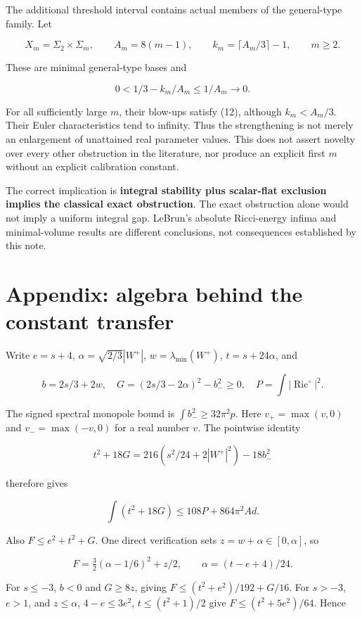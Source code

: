 \documentclass[
  11pt,
]{article}
\begin{document}
The additional threshold interval contains actual members of the
general-type family. Let

\[
X_m=\Sigma_2\times\Sigma_m,\qquad A_m=8(m-1),\qquad
k_m=\lceil A_m/3\rceil-1,\qquad m\ge2.
\]

These are minimal general-type bases and

\[
0<1/3-k_m/A_m\le1/A_m\longrightarrow0.
\]

For all sufficiently large \(m\), their blow-ups satisfy (12), although
\(k_m<A_m/3\). Their Euler characteristics tend to infinity. Thus the
strengthening is not merely an enlargement of unattained real parameter
values. This does not assert novelty over every other obstruction in the
literature, nor produce an explicit first \(m\) without an explicit
calibration constant.

The correct implication is \textbf{integral stability plus scalar-flat
exclusion implies the classical exact obstruction}. The exact
obstruction alone would not imply a uniform integral gap. LeBrun's
absolute Ricci-energy infima and minimal-volume results are different
conclusions, not consequences established by this note.

\hypertarget{appendix-algebra-behind-the-constant-transfer}{%
\section{Appendix: algebra behind the constant
transfer}\label{appendix-algebra-behind-the-constant-transfer}}

Write \(e=s+4\), \(\alpha=\sqrt{2/3}|W^+|\), \(w=\lambda_{\min}(W^+)\),
\(t=s+24\alpha\), and

\[
b=2s/3+2w,\quad
G=(2s/3-2\alpha)^2-b_-^2\ge0,\quad
P=\int|\operatorname{Ric}^{\circ}|^2.
\]

The signed spectral monopole bound is \(\int b_-^2\ge32\pi^2p\). Here
\(v_+=\max(v,0)\) and \(v_-=\max(-v,0)\) for a real number \(v\). The
pointwise identity

\[
t^2+18G=216(s^2/24+2|W^+|^2)-18b_-^2
\]

therefore gives

\[
\int(t^2+18G)\le108P+864\pi^2Ad.
\]

Also \(F\le e^2+t^2+G\). One direct verification sets
\(z=w+\alpha\in[0,\alpha]\), so

\[
F=\tfrac32(\alpha-1/6)^2+z/2,\qquad
\alpha=(t-e+4)/24.
\]

For \(s\le-3\), \(b<0\) and \(G\ge8z\), giving
\(F\le(t^2+e^2)/192+G/16\). For \(s>-3\), \(e>1\), and \(z\le\alpha\),
\(4-e\le3e^2\), \(t\le(t^2+1)/2\) give \(F\le(t^2+5e^2)/64\). Hence
\end{document}
